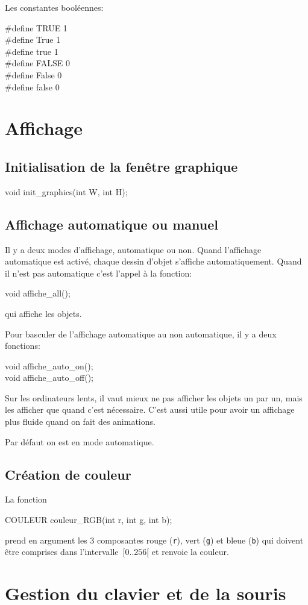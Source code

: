 \documentclass{report}
\newcommand\code[1]{
\begin{mdframed}[linecolor=purple,backgroundcolor=blue!10]
{\tt
#1
}
\end{mdframed}
}
\begin{document}
Les constantes booléennes:
\code{
\#define TRUE 1 \\
\#define True 1 \\
\#define true 1 \\
\#define FALSE 0 \\
\#define False 0 \\
\#define false 0 
}


\section{Affichage}
\subsection{Initialisation de la fenêtre graphique}

\code{
void init\_graphics(int W, int H);
}

\subsection{Affichage automatique ou manuel}
\label{sec:aam}
Il y a deux modes d'affichage, automatique ou non. Quand l'affichage 
automatique est activé, chaque dessin d'objet s'affiche automatiquement. 
Quand il n'est pas automatique c'est l'appel à la fonction:
\code{
void affiche\_all();
}
qui affiche les objets.

Pour basculer de l'affichage automatique au non automatique, il y a 
deux fonctions:
\code{
void affiche\_auto\_on(); \\
void affiche\_auto\_off();
}
Sur les ordinateurs lents, il vaut mieux ne pas afficher 
les objets un par un, mais les afficher que quand c'est nécessaire.
C'est aussi utile pour avoir un affichage plus fluide quand on fait
des animations.

Par défaut on est en mode automatique.

\subsection{Création de couleur}
La fonction
\code{
COULEUR couleur\_RGB(int r, int g, int b);
}
prend en argument les 3 composantes rouge (\texttt{r}), vert (\texttt{g})
et bleue (\texttt{b}) qui doivent être comprises
dans l'intervalle~$[0..256[$ et renvoie la couleur.


\section{Gestion du clavier et de la souris}
\end{document}
